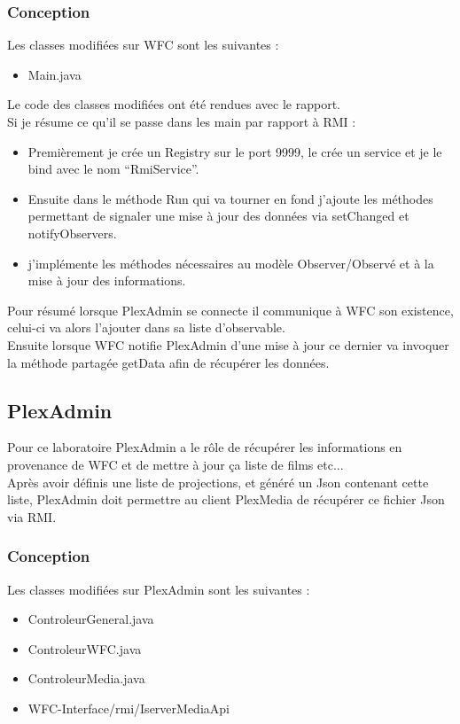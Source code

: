 \documentclass[a4paper]{article}
\begin{document}
\subsubsection{Conception}
Les classes modifiées sur WFC sont les suivantes :
\begin{itemize}
 \item Main.java
\end{itemize}

Le code des classes modifiées ont été rendues avec le rapport.\\

Si je résume ce qu'il se passe dans les main par rapport à RMI : 
\begin{itemize}
 \item Premièrement je crée un Registry sur le port 9999, le crée un service et je le bind avec le nom ``RmiService''.
 \item Ensuite dans le méthode Run qui va tourner en fond j'ajoute les méthodes permettant de signaler une mise à jour des données via
 setChanged et notifyObservers.
 \item j'implémente les méthodes nécessaires au modèle Observer/Observé et à la mise à jour des informations.
\end{itemize}

Pour résumé lorsque PlexAdmin se connecte il communique à WFC son existence, celui-ci va alors l'ajouter dans sa liste d'observable.\\
Ensuite lorsque WFC notifie PlexAdmin d'une mise à jour ce dernier va invoquer la méthode partagée getData afin de récupérer les données.


\subsection{PlexAdmin}
Pour ce laboratoire PlexAdmin a le rôle de récupérer les informations en provenance de WFC et de mettre à jour ça liste de films etc...\\
Après avoir définis une liste de projections, et généré un Json contenant cette liste, PlexAdmin doit permettre au client PlexMedia de récupérer ce fichier Json via RMI.\\

\subsubsection{Conception}
Les classes modifiées sur PlexAdmin sont les suivantes :
\begin{itemize}
 \item ControleurGeneral.java
 \item ControleurWFC.java
 \item ControleurMedia.java
 \item WFC-Interface/rmi/IserverMediaApi
\end{itemize}
\end{document}
